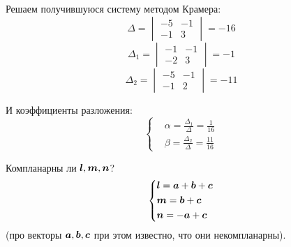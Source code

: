 \documentclass[a4paper,12pt]{article}
\begin{document}
\begin{solution}
    Решаем получившуюся систему методом Крамера:
    \[
      \Delta = \begin{vmatrix}
        -5 & -1\\
        -1 & 3
      \end{vmatrix} = -16
    \]
    \[
      \Delta_1 = \begin{vmatrix}
        -1 & -1\\
        -2 & 3
      \end{vmatrix} = -1
    \]
    \[
      \Delta_2 = \begin{vmatrix}
        -5 & -1\\
        -1 & 2
      \end{vmatrix} = -11
    \]
    
    И коэффициенты разложения:
    \[
      \left\{
        \begin{aligned}
          &\alpha = \frac{\Delta_1}{\Delta} = \frac{1}{16}\\
          &\beta = \frac{\Delta_2}{\Delta} = \frac{11}{16}
        \end{aligned}
      \right.
    \]
  \end{solution}
  

  \begin{problem}[1.11(1)]
    Компланарны ли $\boldsymbol l, \boldsymbol m, \boldsymbol n$?
    \begin{equation}
      \label{eq:problem1.11}
      \left\{
        \begin{aligned}
          &\boldsymbol l = \boldsymbol a + \boldsymbol b + \boldsymbol c\\
          &\boldsymbol m =          \boldsymbol b + \boldsymbol c\\
          &\boldsymbol n = -\boldsymbol a         + \boldsymbol c
        \end{aligned}
      \right.
    \end{equation}
    (про векторы $\boldsymbol a, \boldsymbol b, \boldsymbol c$ при этом известно, что они некомпланарны).
  \end{problem}
  
\end{document}
